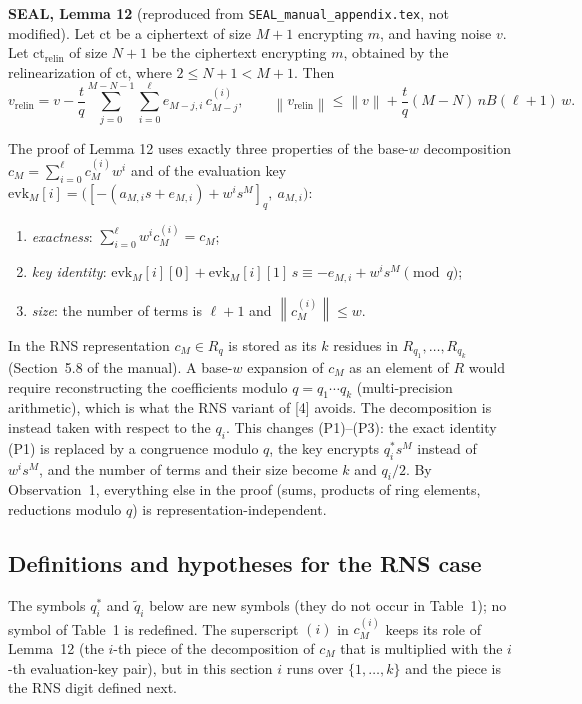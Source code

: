 \documentclass[11pt]{article}
\newcommand{\norm}[1]{\left\lVert #1\right\rVert}
\newcommand{\ct}{\mathrm{ct}}
\newcommand{\ctrelin}{\mathrm{ct}_{\mathrm{relin}}}
\newcommand{\vrelin}{v_{\mathrm{relin}}}
\newcommand{\qstar}[1]{q^{*}_{#1}}
\newcommand{\qtilde}[1]{\tilde{q}_{#1}}
\theoremstyle{plain}
\theoremstyle{definition}
\theoremstyle{remark}
\begin{document}
\textbf{SEAL, Lemma 12} (reproduced from \texttt{SEAL\_manual\_appendix.tex}, not modified).
Let $\ct$ be a ciphertext of size $M+1$ encrypting $m$, and having noise $v$.
Let $\ctrelin$ of size $N+1$ be the ciphertext encrypting $m$, obtained by the
relinearization of $\ct$, where $2\leq N+1<M+1$. Then
\[
 \vrelin=v-\frac{t}{q}\sum_{j=0}^{M-N-1}\sum_{i=0}^{\ell}e_{M-j,i}\,c_{M-j}^{(i)},
 \qquad
 \norm{\vrelin}\leq\norm{v}+\frac{t}{q}(M-N)\,nB(\ell+1)\,w .
\]

The proof of Lemma 12 uses exactly three properties of the base-$w$ decomposition
$c_M=\sum_{i=0}^{\ell}c_M^{(i)}w^i$ and of the evaluation key
$\mathrm{evk}_M[i]=\bigl([-(a_{M,i}s+e_{M,i})+w^is^M]_q,\ a_{M,i}\bigr)$:
\begin{enumerate}[leftmargin=2.5em,label=(P\arabic*)]
\item \emph{exactness}: $\sum_{i=0}^{\ell}w^i c_M^{(i)}=c_M$;
\item \emph{key identity}: $\mathrm{evk}_M[i][0]+\mathrm{evk}_M[i][1]\,s\equiv -e_{M,i}+w^is^M\pmod q$;
\item \emph{size}: the number of terms is $\ell+1$ and $\norm{c_M^{(i)}}\leq w$.
\end{enumerate}

In the RNS representation $c_M\in R_q$ is stored as its $k$ residues in
$R_{q_1},\dots,R_{q_k}$ (Section~5.8 of the manual). A base-$w$ expansion of $c_M$
as an element of $R$ would require reconstructing the coefficients modulo
$q=q_1\cdots q_k$ (multi-precision arithmetic), which is what the RNS variant of
[4] avoids. The decomposition is instead taken with respect to the $q_i$. This
changes (P1)--(P3): the exact identity (P1) is replaced by a congruence modulo $q$,
the key encrypts $\qstar{i}s^M$ instead of $w^is^M$, and the number of terms and
their size become $k$ and $q_i/2$. By Observation~1, everything else in the proof
(sums, products of ring elements, reductions modulo $q$) is representation-independent.

\subsection{Definitions and hypotheses for the RNS case}

The symbols $\qstar{i}$ and $\qtilde{i}$ below are new symbols (they do not occur in
Table~1); no symbol of Table~1 is redefined. The superscript $(i)$ in $c_M^{(i)}$
keeps its role of Lemma~12 (the $i$-th piece of the decomposition of $c_M$ that is
multiplied with the $i$-th evaluation-key pair), but in this section $i$ runs over
$\{1,\dots,k\}$ and the piece is the RNS digit defined next.
\end{document}
